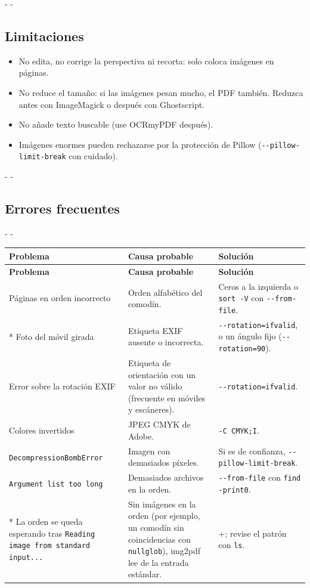 \documentclass[11pt,a4paper]{article}
\makeatletter
\newcommand{\necesitaespacio}[1]{\par\penalty-100\begingroup
	\setlength{\dimen@}{#1}\dimen@ii\pagegoal\advance\dimen@ii-\pagetotal
	\ifdim\dimen@>\dimen@ii\ifdim\dimen@ii>\z@\vfil\fi\penalty-\@M\fi\endgroup}
\newenvironment{errores}{%
	\par\begingroup\small
	\begin{longtable}{L{4.1cm}L{4.9cm}L{6.0cm}}
		\toprule\rowcolor{tablacab}\cab{Problema} & \cab{Causa probable} & \cab{Solución} \\ \midrule
		\endfirsthead
		\toprule\rowcolor{tablacab}\cab{Problema} & \cab{Causa probable} & \cab{Solución} \\ \midrule
		\endhead
		\bottomrule
		\endfoot}
	{\end{longtable}\endgroup}
\newcommand{\cmd}[1]{\texttt{\textcolor{colcmd}{#1}}}      %
\newcommand{\opt}[1]{\texttt{\textcolor{colopt}{#1}}}      %
\newcommand{\tecla}[1]{\tcbox[on line, boxsep=0pt, left=3pt, right=3pt,
	top=1.5pt, bottom=1.5pt, colback=white, colframe=codigoborde,
	boxrule=0.5pt, arc=2pt]{\footnotesize\sffamily #1}}
\newcommand{\cab}[1]{\textbf{#1}}
\makeatother
\begin{document}
	\necesitaespacio{8\baselineskip}
	\subsection{Limitaciones}
	
	\begin{limitacion}
		\begin{itemize}
			\item No edita, no corrige la perspectiva ni recorta: solo coloca imágenes en páginas.
			\item No reduce el tamaño: si las imágenes pesan mucho, el PDF también. Reduzca antes con ImageMagick o después con Ghostscript.
			\item No añade texto buscable (use OCRmyPDF después).
			\item Imágenes enormes pueden rechazarse por la protección de Pillow (\opt{-{}-pillow-\allowbreak{}limit-\allowbreak{}break} con cuidado).
		\end{itemize}
	\end{limitacion}
	
	\necesitaespacio{32\baselineskip}
	\subsection{Errores frecuentes}
	
	\necesitaespacio{28\baselineskip}
	\begin{errores}
		Páginas en orden incorrecto & Orden alfabético del comodín. & Ceros a la izquierda o \cmd{sort -V} con \opt{-{}-from-file}.\\*
		Foto del móvil girada & Etiqueta EXIF ausente o incorrecta. & \opt{-{}-rotation=\allowbreak{}ifvalid}, o un ángulo fijo (\opt{-{}-rotation=90}).\\
		Error sobre la rotación EXIF & Etiqueta de orientación con un valor no válido (frecuente en móviles y escáneres). & \opt{-{}-rotation=\allowbreak{}ifvalid}.\\
		Colores invertidos & JPEG CMYK de Adobe. & \opt{-C CMYK;I}.\\
		\texttt{DecompressionBombError} & Imagen con demasiados píxeles. & Si es de confianza, \opt{-{}-pillow-\allowbreak{}limit-\allowbreak{}break}.\\
		\texttt{Argument list too long} & Demasiados archivos en la orden. & \opt{-{}-from-file} con \cmd{find -print0}.\\*
		La orden se queda esperando tras \texttt{Reading image from standard input...} & Sin imágenes en la orden (por ejemplo, un comodín sin coincidencias con \cmd{nullglob}), img2pdf lee de la entrada estándar. & \tecla{Ctrl}+\tecla{C}; revise el patrón con \cmd{ls}.\\
	\end{errores}
	
\end{document}

